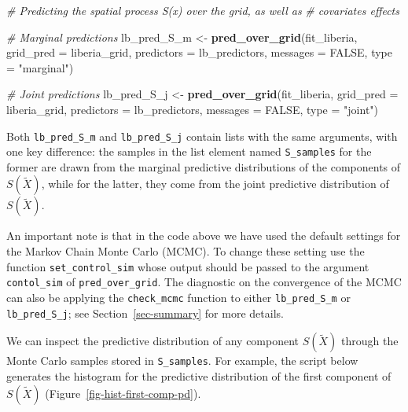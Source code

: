 \documentclass[
  letterpaper,
]{krantz}
\newenvironment{Shaded}{\begin{snugshade}}{\end{snugshade}}
\newcommand{\AttributeTok}[1]{\textcolor[rgb]{0.13,0.29,0.53}{#1}}
\newcommand{\CommentTok}[1]{\textcolor[rgb]{0.56,0.35,0.01}{\textit{#1}}}
\newcommand{\ConstantTok}[1]{\textcolor[rgb]{0.56,0.35,0.01}{#1}}
\newcommand{\FunctionTok}[1]{\textcolor[rgb]{0.13,0.29,0.53}{\textbf{#1}}}
\newcommand{\NormalTok}[1]{#1}
\newcommand{\OtherTok}[1]{\textcolor[rgb]{0.56,0.35,0.01}{#1}}
\newcommand{\StringTok}[1]{\textcolor[rgb]{0.31,0.60,0.02}{#1}}
\begin{document}
\begin{Shaded}
\begin{Highlighting}[]
\CommentTok{\# Predicting the spatial process S(x) over the grid, as well as}
\CommentTok{\# covariates effects}

\CommentTok{\# Marginal predictions}
\NormalTok{lb\_pred\_S\_m }\OtherTok{\textless{}{-}} \FunctionTok{pred\_over\_grid}\NormalTok{(fit\_liberia, }
                            \AttributeTok{grid\_pred =}\NormalTok{ liberia\_grid, }
               \AttributeTok{predictors =}\NormalTok{ lb\_predictors, }\AttributeTok{messages =} \ConstantTok{FALSE}\NormalTok{,}
               \AttributeTok{type =} \StringTok{"marginal"}\NormalTok{)}

\CommentTok{\# Joint predictions}
\NormalTok{lb\_pred\_S\_j }\OtherTok{\textless{}{-}} \FunctionTok{pred\_over\_grid}\NormalTok{(fit\_liberia, }
                            \AttributeTok{grid\_pred =}\NormalTok{ liberia\_grid, }
               \AttributeTok{predictors =}\NormalTok{ lb\_predictors, }\AttributeTok{messages =} \ConstantTok{FALSE}\NormalTok{,}
               \AttributeTok{type =} \StringTok{"joint"}\NormalTok{)}
\end{Highlighting}
\end{Shaded}

Both \texttt{lb\_pred\_S\_m} and \texttt{lb\_pred\_S\_j} contain lists
with the same arguments, with one key difference: the samples in the
list element named \texttt{S\_samples} for the former are drawn from the
marginal predictive distributions of the components of \(S(\tilde{X})\),
while for the latter, they come from the joint predictive distribution
of \(S(\tilde{X})\).

An important note is that in the code above we have used the default
settings for the Markov Chain Monte Carlo (MCMC). To change these
setting use the function \texttt{set\_control\_sim} whose output should
be passed to the argument \texttt{contol\_sim} of
\texttt{pred\_over\_grid}. The diagnostic on the convergence of the MCMC
can also be applying the \texttt{check\_mcmc} function to either
\texttt{lb\_pred\_S\_m} or \texttt{lb\_pred\_S\_j}; see
Section~\ref{sec-summary} for more details.

We can inspect the predictive distribution of any component
\(S(\tilde{X})\) through the Monte Carlo samples stored in
\texttt{S\_samples}. For example, the script below generates the
histogram for the predictive distribution of the first component of
\(S(\tilde{X})\) (Figure~\ref{fig-hist-first-comp-pd}).
\end{document}
